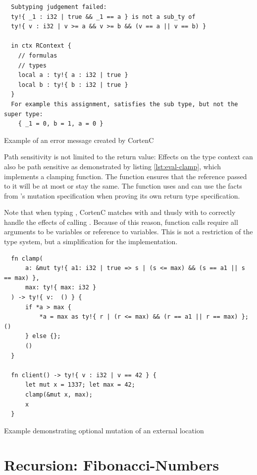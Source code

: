 \documentclass[twoside, english, final]{sdqthesis}
\theoremstyle{definition}
\begin{document}
\begin{listing}[h]
  \begin{verbatim}
  Subtyping judgement failed: 
  ty!{ _1 : i32 | true && _1 == a } is not a sub_ty of 
  ty!{ v : i32 | v >= a && v >= b && (v == a || v == b) } 

  in ctx RContext {
    // formulas
    // types
    local a : ty!{ a : i32 | true }
    local b : ty!{ b : i32 | true }
  }
  For example this assignment, satisfies the sub type, but not the super type:
    { _1 = 0, b = 1, a = 0 }
  \end{verbatim}
  \caption{Example of an error message created by CortenC}
  \label{lst:eval-max-error}
\end{listing}

Path sensitivity is not limited to the return value: Effects on the type context can also be path sensitive as demonstrated by listing \ref{lst:eval-clamp}, which implements a clamping function. The function  ensures that the reference passed to it will be at most  or stay the same. The  function uses  and can use the facts from 's mutation specification when proving its own return type specification.

Note that when typing , CortenC matches  with  and thusly  with  to correctly handle the effects of calling . Because of this reason, function calls require all arguments to be variables or reference to variables. This is not a restriction of the type system, but a simplification for the implementation.

\begin{listing}[h]
  \begin{verbatim}
  fn clamp(
      a: &mut ty!{ a1: i32 | true => s | (s <= max) && (s == a1 || s == max) }, 
      max: ty!{ max: i32 }
  ) -> ty!{ v:  () } {
      if *a > max {
          *a = max as ty!{ r | (r <= max) && (r == a1 || r == max) }; ()
      } else {};
      ()
  }

  fn client() -> ty!{ v : i32 | v == 42 } {
      let mut x = 1337; let max = 42;
      clamp(&mut x, max);
      x
  }
  \end{verbatim}
  \caption{Example demonstrating optional mutation of an external location}
  \label{lst:eval-clamp}
\end{listing}

\section{Recursion: Fibonacci-Numbers}\label{sec:eval-fibonacci}
\end{document}
